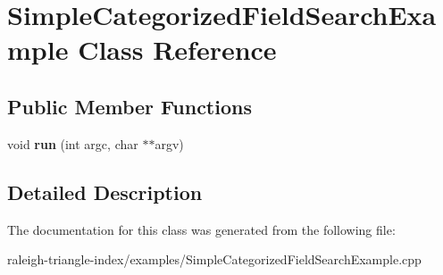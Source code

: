 \section{Simple\+Categorized\+Field\+Search\+Example Class Reference}
\label{class_simple_categorized_field_search_example}
\subsection*{Public Member Functions}
\begin{DoxyCompactItemize}
\item 
void {\bfseries run} (int argc, char $\ast$$\ast$argv)\label{class_simple_categorized_field_search_example_ad9c917fca28d7286a0de164f1b2da9c8}

\end{DoxyCompactItemize}


\subsection{Detailed Description}


The documentation for this class was generated from the following file\+:\begin{DoxyCompactItemize}
\item 
raleigh-\/triangle-\/index/examples/Simple\+Categorized\+Field\+Search\+Example.\+cpp\end{DoxyCompactItemize}
